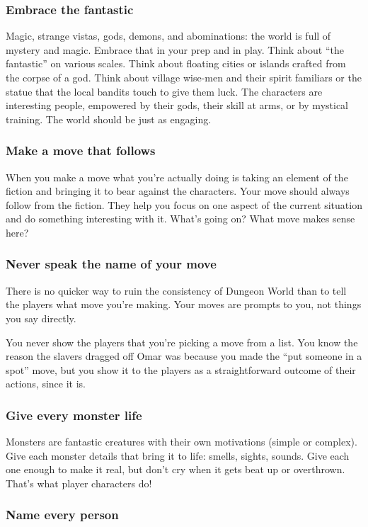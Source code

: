 \subsubsection{Embrace the fantastic}


 Magic, strange vistas, gods, demons, and abominations: the world is full of mystery and magic. Embrace that in your prep and in play. Think about ``the fantastic'' on various scales. Think about floating cities or islands crafted from the corpse of a god. Think about village wise-men and their spirit familiars or the statue that the local bandits touch to give them luck. The characters are interesting people, empowered by their gods, their skill at arms, or by mystical training. The world should be just as engaging.
\subsubsection{Make a move that follows}


 When you make a move what you're actually doing is taking an element of the fiction and bringing it to bear against the characters. Your move should always follow from the fiction. They help you focus on one aspect of the current situation and do something interesting with it. What's going on? What move makes sense here?
\subsubsection{Never speak the name of your move}


 There is no quicker way to ruin the consistency of Dungeon World than to tell the players what move you're making. Your moves are prompts to you, not things you say directly.


 You never show the players that you're picking a move from a list. You know the reason the slavers dragged off Omar was because you made the ``put someone in a spot'' move, but you show it to the players as a straightforward outcome of their actions, since it is.
\subsubsection{Give every monster life}


 Monsters are fantastic creatures with their own motivations (simple or complex). Give each monster details that bring it to life: smells, sights, sounds. Give each one enough to make it real, but don't cry when it gets beat up or overthrown. That's what player characters do!
\subsubsection{Name every person}


